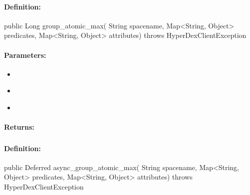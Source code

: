 \paragraph{Definition:}
\begin{javacode}
public Long group_atomic_max(
        String spacename,
        Map<String, Object> predicates,
        Map<String, Object> attributes) throws HyperDexClientException
\end{javacode}

\paragraph{Parameters:}
\begin{itemize}[noitemsep]
\item {}\\

\item {}\\

\item {}\\

\end{itemize}

\paragraph{Returns:}


\pagebreak
\subsubsection{}
\label{api:java:async_group_atomic_max}


\paragraph{Definition:}
\begin{javacode}
public Deferred async_group_atomic_max(
        String spacename,
        Map<String, Object> predicates,
        Map<String, Object> attributes) throws HyperDexClientException
\end{javacode}

